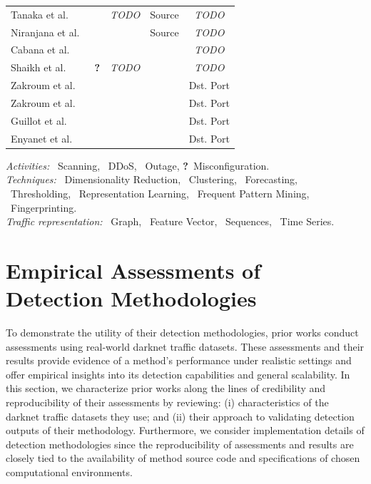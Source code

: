 \documentclass[manuscript,nonacm]{acmart}
\newcommand{\markA}{\ding{66}}%
\newcommand{\markB}{\ding{71}}%
\newcommand{\markC}{\ding{75}}%
\newcommand{\markD}{\ding{168}}%
\newcommand{\markE}{\ding{169}}%
\newcommand{\markF}{\ding{170}}%
\newcommand{\markG}{\ding{171}}%
\newcommand{\markH}{\ding{92}}%
\newcommand{\markI}{\ding{214}}%
\newcommand{\markJ}{\ding{166}}%
\newcommand{\markX}{\Sagittarius} %
\newcommand{\markY}{\Virgo}
\newcommand{\markZ}{\Moon}
\newcommand{\markEtc}{\textbf{?}}
\begin{document}
\begin{table}[t]
\begin{tabular}{llllc}
        Tanaka et al.~\cite{2023tanaka,2021tanaka} & \markX & \textit{TODO} & Source & \textit{TODO} \\
        Niranjana et al.~\cite{2019niranjana} & \markX & \markA\markB & Source & \textit{TODO} \\
        Cabana et al.~\cite{2019cabana} & \markX & \markB\markH & \markD\markE & \textit{TODO} \\
        Shaikh et al.~\cite{2018shaikh} & \markX\markY\markZ\markEtc & \textit{TODO} & \markE & \textit{TODO} \\  
        Zakroum et al.~\cite{2022zakroum,2018zakroum} & \markX & \markC\markB & \markG & Dst. Port \\
        Zakroum et al.~\cite{2023zakroum} & \markX & \markC\markB & \markG & Dst. Port \\
        Guillot et al.~\cite{2019guillot} & \markZ& \markC\markB & \markG & Dst. Port \\
        Enyanet et al.~\cite{2024enyanet} & \markZ & \markC\markB & \markG & Dst. Port \\
        \bottomrule
    \end{tabular}

    \vspace{2pt}
    \parbox{\linewidth}{\raggedright
        \textit{Activities:} \markX~Scanning, \markY~DDoS, \markZ~Outage, \markEtc~Misconfiguration.\\
        \textit{Techniques:} \markA~Dimensionality Reduction, \markB~Clustering, \markC~Forecasting, \markH~Thresholding, \markI~Representation Learning, \markJ~Frequent Pattern Mining, \markH~Fingerprinting.\\
        \textit{Traffic representation:} \markD~Graph, \markE~Feature Vector, \markF~Sequences, \markG~Time Series.
    }
\end{table}



\label{sec:evaluations}
\section{Empirical Assessments of Detection Methodologies}

To demonstrate the utility of their detection methodologies, prior works conduct assessments using real-world darknet traffic datasets.
These assessments and their results provide evidence of a method's performance under realistic settings and offer empirical insights into its detection capabilities and general scalability.
In this section, we characterize prior works along the lines of credibility and reproducibility of their assessments by reviewing:
(i) characteristics of the darknet traffic datasets they use; and
(ii) their approach to validating detection outputs of their methodology.
Furthermore, we consider implementation details of detection methodologies since the reproducibility of assessments and results are closely tied to the availability of method source code and specifications of chosen computational environments.
\end{document}
